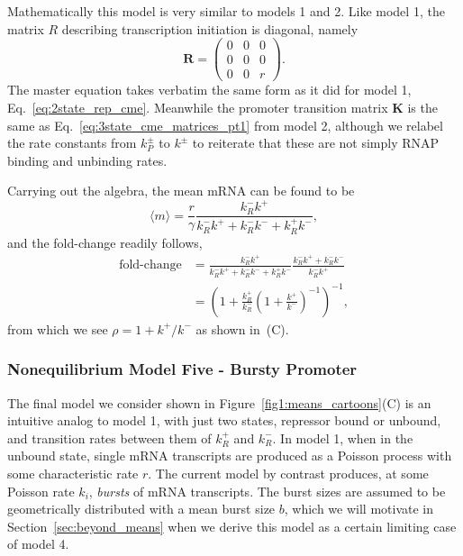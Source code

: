 Mathematically this model is very similar to models 1 and 2. Like model 1, the
matrix $R$ describing transcription initiation is diagonal, namely
\begin{equation}
\mathbf{R} = \begin{pmatrix}
                0 & 0 & 0 \\ 
                0 & 0 & 0 \\ 
                0 & 0 & r
        \end{pmatrix}.
\end{equation}
The master equation takes verbatim the same form as it did for model 1,
Eq.~\ref{eq:2state_rep_cme}. Meanwhile the promoter transition
matrix $\mathbf{K}$ is the same as Eq.~\ref{eq:3state_cme_matrices_pt1}
from model 2, although we relabel the
rate constants from $k_P^\pm$ to $k^\pm$ to reiterate that these are not simply
RNAP binding and unbinding rates.

Carrying out the algebra, the mean mRNA can be found to be
\begin{equation}
\langle m\rangle = \frac{r}{\gamma}
\frac{k_R^- k^+}
{k_R^- k^+ + k_R^- k^- + k_R^+ k^-},
\end{equation}
and the fold-change readily follows,
\begin{align}
\text{fold-change}
&=      \frac{k_R^- k^+}{k_R^- k^+ + k_R^- k^- + k_R^+ k^-}
        \frac{k_R^- k^+ + k_R^- k^-}{k_R^- k^+}
\\
&=      \left(1 + \frac{k_R^+}{k_R^-}
                \left(1 + \frac{k^+}{k^-}\right)^{-1}
        \right)^{-1},
\end{align}
from which we see $\rho = 1 + k^+/k^-$ as shown in~(C).

\subsubsection{Nonequilibrium Model Five - Bursty Promoter}
The final model we consider shown in Figure~\ref{fig1:means_cartoons}(C) is an
intuitive analog to model 1, with just two states, repressor bound or unbound,
and transition rates between them of $k_R^+$ and $k_R^-$. In model 1, when in
the unbound state, single mRNA transcripts are produced as a Poisson process
with some characteristic rate $r$. The current model by contrast produces, at
some Poisson rate $k_i$, \textit{bursts} of mRNA transcripts.
The burst sizes are assumed to be geometrically distributed with
a mean burst size $b$, which we will motivate in Section~\ref{sec:beyond_means}
when we derive this model as a certain limiting case of model 4.

